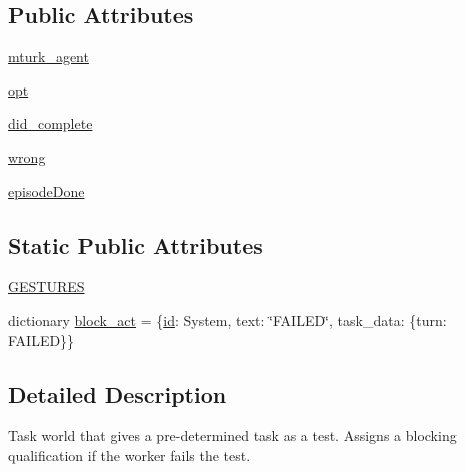 \subsection*{Public Attributes}
\begin{DoxyCompactItemize}
\item 
\hyperlink{classlight__chat__eval_1_1worlds_1_1LightEvalTestWorld_a4d4fdebfcb25486f1ef39d349aee472d}{mturk\+\_\+agent}
\item 
\hyperlink{classlight__chat__eval_1_1worlds_1_1LightEvalTestWorld_af30a480a616bdff00533b91ea3bbb5ce}{opt}
\item 
\hyperlink{classlight__chat__eval_1_1worlds_1_1LightEvalTestWorld_afe28ccafcf819129c3d98b19a5002a31}{did\+\_\+complete}
\item 
\hyperlink{classlight__chat__eval_1_1worlds_1_1LightEvalTestWorld_ac3f300a69906b04a0f0372712b3ae8ef}{wrong}
\item 
\hyperlink{classlight__chat__eval_1_1worlds_1_1LightEvalTestWorld_ac20e00446776ea56707bc1e98a52ce35}{episode\+Done}
\end{DoxyCompactItemize}
\subsection*{Static Public Attributes}
\begin{DoxyCompactItemize}
\item 
\hyperlink{classlight__chat__eval_1_1worlds_1_1LightEvalTestWorld_aa52cfc2c62b730cf0240a26dacfe14e9}{G\+E\+S\+T\+U\+R\+ES}
\item 
dictionary \hyperlink{classlight__chat__eval_1_1worlds_1_1LightEvalTestWorld_a75223ad0eed20c1a3de0a1efac4e833a}{block\+\_\+act} = \{\textquotesingle{}\hyperlink{classparlai_1_1core_1_1worlds_1_1World_a568184e1c2ccaff10d9a0b69ecb8115a}{id}\textquotesingle{}\+: \textquotesingle{}System\textquotesingle{}, \textquotesingle{}text\textquotesingle{}\+: \char`\"{}F\+A\+I\+L\+ED\char`\"{}, \textquotesingle{}task\+\_\+data\textquotesingle{}\+: \{\textquotesingle{}turn\textquotesingle{}\+: \textquotesingle{}F\+A\+I\+L\+ED\textquotesingle{}\}\}
\end{DoxyCompactItemize}


\subsection{Detailed Description}
\begin{DoxyVerb}Task world that gives a pre-determined task as a test. Assigns a
blocking qualification if the worker fails the test.
\end{DoxyVerb}
 

